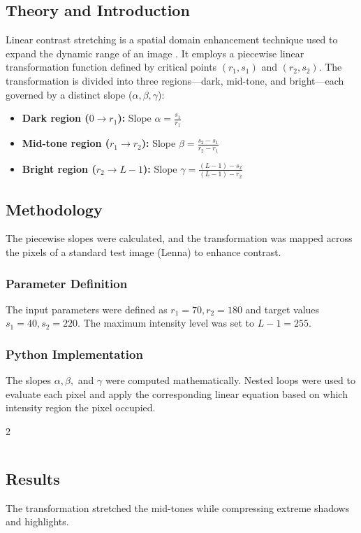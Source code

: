 \documentclass[11pt]{article}
\begin{document}
\subsection{Theory and Introduction}
Linear contrast stretching is a spatial domain enhancement technique used to expand the dynamic range of an image \cite{gonzalez2018}. It employs a piecewise linear transformation function defined by critical points $(r_1, s_1)$ and $(r_2, s_2)$. The transformation is divided into three regions—dark, mid-tone, and bright—each governed by a distinct slope ($\alpha, \beta, \gamma$):
\begin{itemize}
    \item \textbf{Dark region ($0 \to r_1$):} Slope $\alpha = \frac{s_1}{r_1}$
    \item \textbf{Mid-tone region ($r_1 \to r_2$):} Slope $\beta = \frac{s_2 - s_1}{r_2 - r_1}$
    \item \textbf{Bright region ($r_2 \to L-1$):} Slope $\gamma = \frac{(L-1) - s_2}{(L-1) - r_2}$
\end{itemize}

\subsection{Methodology}
The piecewise slopes were calculated, and the transformation was mapped across the pixels of a standard test image (Lenna) to enhance contrast.

\subsubsection{Parameter Definition}
The input parameters were defined as $r_1 = 70, r_2 = 180$ and target values $s_1 = 40, s_2 = 220$. The maximum intensity level was set to $L-1 = 255$.

\subsubsection{Python Implementation}
The slopes $\alpha, \beta,$ and $\gamma$ were computed mathematically. Nested loops were used to evaluate each pixel and apply the corresponding linear equation based on which intensity region the pixel occupied.

\begin{multicols}{2}
    \inputminted{python3}{./assets/lab6.py}
\end{multicols}

\subsection{Results}
The transformation stretched the mid-tones while compressing extreme shadows and highlights.
\end{document}
